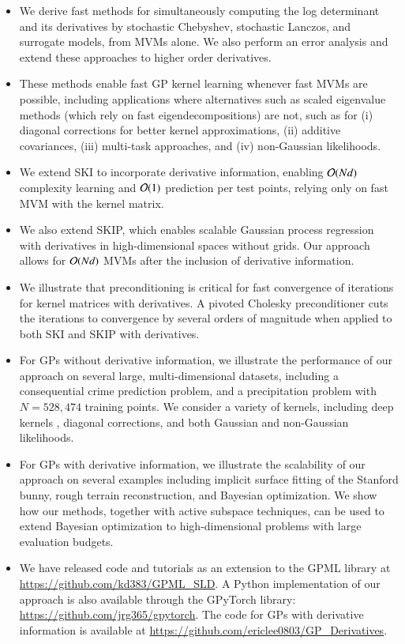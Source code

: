 \begin{itemize}
  \item We derive fast methods for simultaneously computing the log determinant
  and its derivatives by stochastic Chebyshev, stochastic Lanczos, and surrogate
  models, from MVMs alone. We also perform an error analysis and extend these
  approaches to higher order derivatives.

  \item These methods enable fast GP kernel learning whenever fast MVMs are
  possible, including applications where alternatives such as scaled eigenvalue
  methods (which rely on fast eigendecompositions) are not, such as for (i)
  diagonal corrections for better kernel approximations, (ii) additive
  covariances, (iii) multi\hyp{}task approaches, and (iv) non\hyp{}Gaussian
  likelihoods.

  \item We extend SKI to incorporate derivative information, enabling $\mathcal{O}
  (Nd)$ complexity learning and $\mathcal{O}(1)$ prediction per test points, relying
  only on fast MVM with the kernel matrix.

  \item We also extend SKIP, which enables scalable Gaussian process regression
  with derivatives in high\hyp{}dimensional spaces without grids. Our approach
  allows for $\mathcal{O}(Nd)$ MVMs after the inclusion of derivative information.

  \item We illustrate that preconditioning is critical for fast convergence of
  iterations for kernel matrices with derivatives. A pivoted Cholesky
  preconditioner cuts the iterations to convergence by several orders of
  magnitude when applied to both SKI and SKIP with derivatives.

  \item For GPs without derivative information, we illustrate the performance of
  our approach on several large, multi\hyp{}dimensional datasets, including a
  consequential crime prediction problem, and a precipitation problem with $N =
  528,474$ training points. We consider a variety of kernels, including deep
  kernels \citep{wilson2016deep}, diagonal corrections, and both Gaussian and
  non\hyp{}Gaussian likelihoods.

  \item For GPs with derivative information, we illustrate the scalability of
  our approach on several examples including implicit surface fitting of the
  Stanford bunny, rough terrain reconstruction, and Bayesian optimization. We
  show how our methods, together with active subspace techniques, can be used to
  extend Bayesian optimization to high\hyp{}dimensional problems with large
  evaluation budgets.

  \item We have released code and tutorials as an extension to the GPML library 
  \citep{rasmussen10gpml} at \url{https://github.com/kd383/GPML_SLD}. A Python
  implementation of our approach is also available through the GPyTorch library:
  \url{https://github.com/jrg365/gpytorch}. The code for GPs with derivative
  information is available at 
  \url{https://github.com/ericlee0803/GP_Derivatives}.
\end{itemize}


